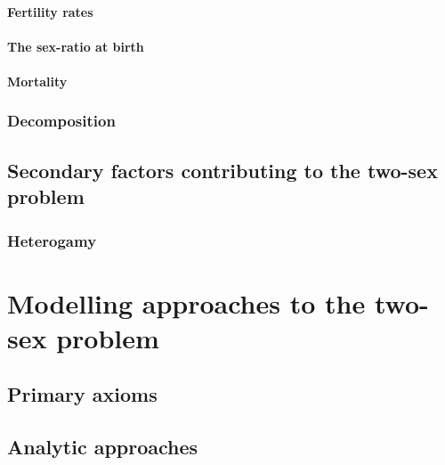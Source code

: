       \subsubsection{Fertility rates}
        
      
      \subsubsection{The sex-ratio at birth}
        
      
      \subsubsection{Mortality}
        
    
    \subsection{Decomposition}
  
  \section{Secondary factors contributing to the two-sex problem}
    
    \subsection{Heterogamy}
      
      

\chapter{Modelling approaches to the two-sex problem}
  

  \section{Primary axioms}
    
    
  \section{Analytic approaches}
  
